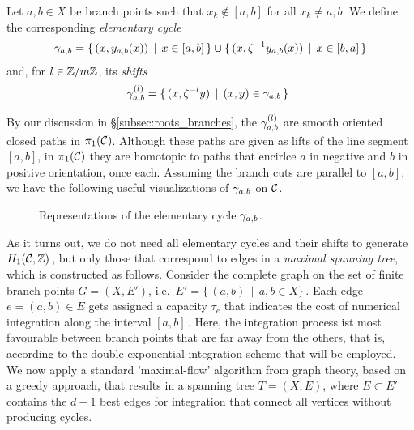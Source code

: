 \documentclass[main.tex]{subfiles}
\begin{document}
   \begin{defn}\label{def:elem_cycle}
   Let $a, b \in X$ be branch points such that $x_k \not\in [a,b]$ for all $x_k \ne a,b$. We define the corresponding \textit{elementary cycle} 
   \begin{align}
    \gamma_{a,b} = \{ \, (x,y_{a,b}(x)) \, \mid \, x \in [a,b] \, \} \cup \{ \,(x,\zeta^{-1} y_{a,b}(x)) \, \mid \, x \in [b,a] \, \}
   \end{align}
   and, for $l \in \mathbb{Z}/m\mathbb{Z}$, its \textit{shifts}
   \begin{align}
    \gamma_{a,b}^{(l)} = \{ \, (x,\zeta^{-l}y) \, \mid \, (x,y) \in \gamma_{a,b} \, \}\,. 
   \end{align}
    \end{defn}
    
   By our discussion in \S \ref{subsec:roots_branches}, the $\gamma_{a,b}^{(l)}$ are smooth oriented closed paths in $\pi_1(\mathcal{C})$. Although these paths are given as lifts of the line segment $[a,b]$, in $\pi_1(\mathcal{C})$
   they are homotopic to paths that encirlce  $a$ in negative and $b$ in positive orientation, once each.
   Assuming the branch cuts are parallel to $[a,b]$, we have the following useful visualizations of $\gamma_{a,b}$ on $\mathcal{C}$.
   \begin{figure}[H]
      \begin{center}
	  
      \end{center}
    \caption{Representations of the elementary cycle $\gamma_{a,b}$.} 
    \label{fig:elem_cycle}
\end{figure}
 
 
  As it turns out, we do not need all elementary cycles and their shifts to generate $H_1(\mathcal{C},\mathbb{Z})$\,, but only those that correspond to edges in a \emph{maximal spanning tree}, which is constructed
  as follows. \abstand
   Consider the complete graph on the set of finite branch points $G = (X,E')$, i.e.\ $E' = \{ \, (a,b) \, \mid \, a,b \in X \}$\,.
   Each edge $e = (a,b) \in E$ gets assigned a capacity $\tau_e$ that indicates the cost of numerical integration along the interval $[a,b]$\,. Here, the integration process ist most favourable
   between branch points that are far away from the others, that is, according to the double-exponential integration scheme that will be employed.
   We now apply a standard 'maximal-flow' algorithm from graph theory, based on a greedy approach, that results in a spanning tree $T = (X,E)$, where $E \subset E'$ contains the $d-1$ best edges
   for integration that connect all vertices without producing cycles.
  
\end{document}
